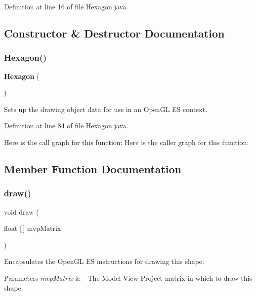 Definition at line 16 of file Hexagon.\+java.



\subsection{Constructor \& Destructor Documentation}
\mbox{\label{classsf_1_1unitingtwist_1_1_hexagon_aadc1f20d3bb3b975b0e03c519a7f8917}} 
\subsubsection{Hexagon()}
{\footnotesize\ttfamily \textbf{ Hexagon} (\begin{DoxyParamCaption}{ }\end{DoxyParamCaption})}



Sets up the drawing object data for use in an Open\+GL ES context. 



Definition at line 84 of file Hexagon.\+java.

Here is the call graph for this function\+:
Here is the caller graph for this function\+:


\subsection{Member Function Documentation}
\mbox{\label{classsf_1_1unitingtwist_1_1_hexagon_ace8a0d2a4e41b6d83897d48fd91a7ab3}} 
\subsubsection{draw()}
{\footnotesize\ttfamily void draw (\begin{DoxyParamCaption}\item[{float [$\,$]}]{mvp\+Matrix }\end{DoxyParamCaption})}



Encapsulates the Open\+GL ES instructions for drawing this shape. 


\begin{DoxyParams}{Parameters}
{\em mvp\+Matrix} & -\/ The Model View Project matrix in which to draw this shape. \\
\hline
\end{DoxyParams}



